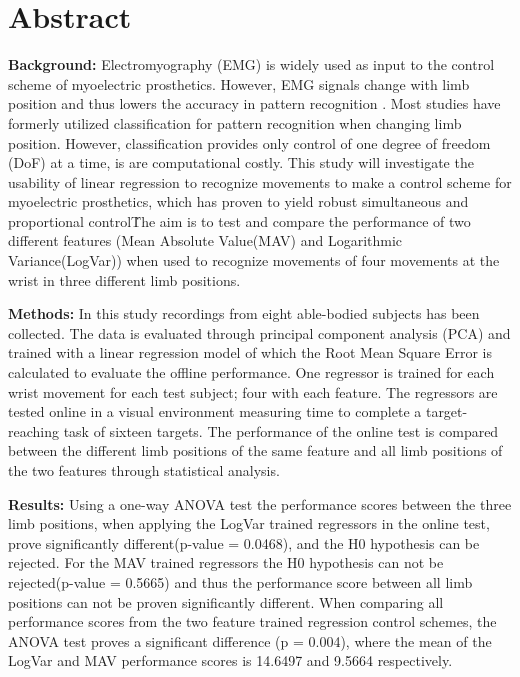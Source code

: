\section{Abstract}

\textbf{Background:} Electromyography (EMG) is widely used as input to the control scheme of myoelectric prosthetics. However, EMG signals change with limb position and thus lowers the accuracy in pattern recognition \cite{Fougner2010}.%
Most studies have formerly utilized classification for pattern recognition when changing limb position.  
However, classification provides only control of one degree of freedom (DoF) at a time, is are computational costly. This study will investigate the usability of linear regression to recognize movements to make a control scheme for myoelectric prosthetics, which has proven to yield robust simultaneous and proportional control\cite{hahne2014}\. The aim is to test and compare the performance of two different features (Mean Absolute Value(MAV) and Logarithmic Variance(LogVar)) when used to recognize movements of four movements at the wrist in three different limb positions. 


\textbf{Methods:} In this study recordings from eight able-bodied subjects has been collected. The data is evaluated through principal component analysis (PCA) and trained with a linear regression model of which the Root Mean Square Error is calculated to evaluate the offline performance. One regressor is trained for each wrist movement for each test subject; four with each feature. The regressors are tested online in a visual environment measuring time to complete a target-reaching task of sixteen targets. The performance of the online test is compared between the different limb positions of the same feature and all limb positions of the two features through statistical analysis.


\textbf{Results:} 
Using a one-way ANOVA test the performance scores between the three limb positions, when applying the LogVar trained regressors in the online test, prove significantly different(p-value = 0.0468), and the H0 hypothesis can be rejected. For the MAV trained regressors the H0 hypothesis can not be rejected(p-value = 0.5665) and thus the performance score between all limb positions can not be proven significantly different. When comparing all performance scores from the two feature trained regression control schemes, the ANOVA test proves a significant difference (p = 0.004), where the mean of the LogVar and MAV performance scores is 14.6497 and 9.5664 respectively. 

